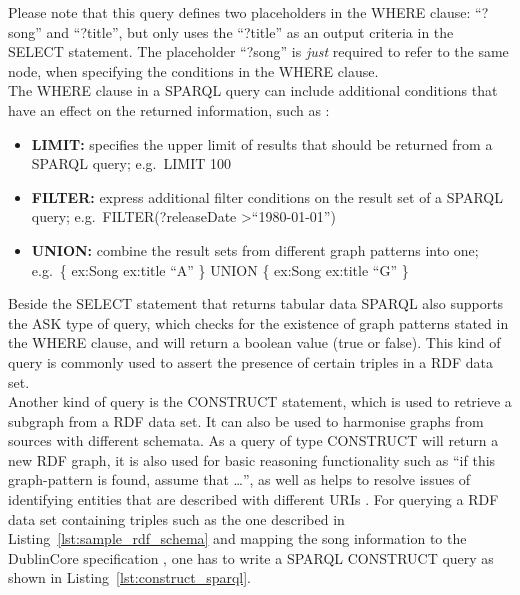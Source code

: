 
Please note that this query defines two placeholders in the WHERE clause: ``?song'' and ``?title'', but only uses the ``?title'' as an output criteria in the SELECT statement. The placeholder ``?song'' is \emph{just} required to refer to the same node, when specifying the conditions in the WHERE clause. \\

The WHERE clause in a \gls{SPARQL} query can include additional conditions that have an effect on the returned information, such as \citep[pg. 66-112]{allemang2011semantic}: \@

\begin{itemize}
	\item \textbf{LIMIT:} specifies the upper limit of results that should be returned from a \gls{SPARQL} query; e.g.\ LIMIT 100
	\item \textbf{FILTER:} express additional filter conditions on the result set of a \gls{SPARQL} query; e.g.\ FILTER(?releaseDate \textgreater ``1980-01-01'')
	\item \textbf{UNION:} combine the result sets from different graph patterns into one; e.g.\ \{ ex:Song ex:title ``A'' \} UNION \{ ex:Song ex:title ``G'' \}
\end{itemize}

Beside the SELECT statement that returns tabular data \gls{SPARQL} also supports the ASK type of query, which checks for the existence of graph patterns stated in the WHERE clause, and will return a boolean value (true or false). This kind of query is commonly used to assert the presence of certain triples in a \gls{RDF} data set. \\

Another kind of query is the CONSTRUCT statement, which is used to retrieve a subgraph from a \gls{RDF} data set. It can also be used to harmonise graphs from sources with different schemata. As a query of type CONSTRUCT will return a new \gls{RDF} graph, it is also used for basic reasoning functionality such as ``if this graph-pattern is found, assume that \ldots'', as well as helps to resolve issues of identifying entities that are described with different \gls{URI}s \citep[pg. 88-98]{allemang2011semantic}.
For querying a \gls{RDF} data set containing triples such as the one described in Listing~\ref{lst:sample_rdf_schema} and mapping the song information to the DublinCore specification \citep{DublinCore}, one has to write a \gls{SPARQL} CONSTRUCT query as shown in Listing~\ref{lst:construct_sparql}. \@

